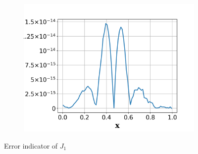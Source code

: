 \documentclass[a4paper]{article}
\begin{document}
\begin{figure}[!htbp]
\begin{subfigure}{0.325\textwidth}
    \centering
    \includegraphics[width=1.0\linewidth]{figures/elem_J1error_indicator_p3.png}
    \label{fig:subsonic_J1_eta_p3}
  \end{subfigure}
  \caption{Error indicator of $J_1$}
  \label{fig:elem_J1_error}
\end{figure}
\end{document}
